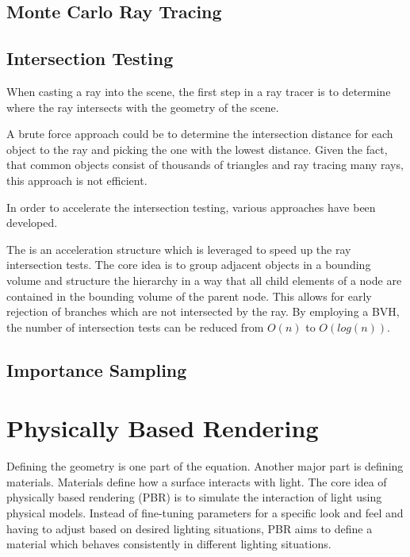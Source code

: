 \subsection{Monte Carlo Ray Tracing}
\subsection{Intersection Testing}

When casting a ray into the scene, the first step in a ray tracer is to determine where the ray intersects with the geometry of the scene.

A brute force approach could be to determine the intersection distance for each object to the ray and picking the one with the lowest distance. Given the fact, that common objects consist of thousands of triangles and ray tracing many rays, this approach is not efficient.

In order to accelerate the intersection testing, various approaches have been developed.

The  is an acceleration structure which is leveraged to speed up the ray intersection tests. The core idea is to group adjacent objects in a bounding volume and structure the hierarchy in a way that all child elements of a node are contained in the bounding volume of the parent node. This allows for early rejection of branches which are not intersected by the ray. By employing a BVH, the number of intersection tests can be reduced from $O(n)$ to $O(log(n))$.

\subsection{Importance Sampling}

\section{Physically Based Rendering}

Defining the geometry is one part of the equation. Another major part is defining materials. Materials define how a surface interacts with light. The core idea of physically based rendering (PBR) is to simulate the interaction of light using physical models. Instead of fine-tuning parameters for a specific look and feel and having to adjust based on desired lighting situations, PBR aims to define a material which behaves consistently in different lighting situations.

